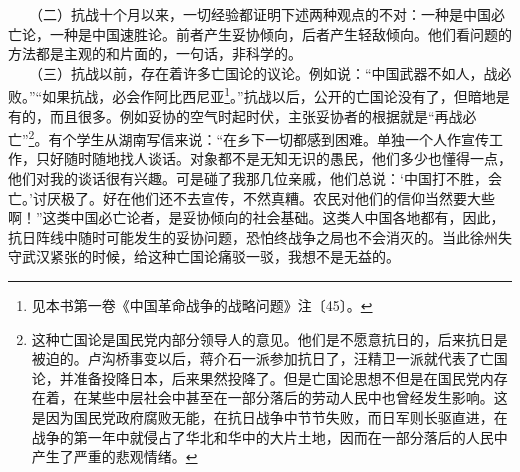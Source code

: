 \documentclass[cn,11pt,chinese]{elegantbook}
\begin{document}
　　（二）抗战十个月以来，一切经验都证明下述两种观点的不对：一种是中国必亡论，一种是中国速胜论。前者产生妥协倾向，后者产生轻敌倾向。他们看问题的方法都是主观的和片面的，一句话，非科学的。\\
　　（三）抗战以前，存在着许多亡国论的议论。例如说：“中国武器不如人，战必败。”“如果抗战，必会作阿比西尼亚\footnote[2]{ 见本书第一卷《中国革命战争的战略问题》注〔45〕。}。”抗战以后，公开的亡国论没有了，但暗地是有的，而且很多。例如妥协的空气时起时伏，主张妥协者的根据就是“再战必亡”\footnote[3]{ 这种亡国论是国民党内部分领导人的意见。他们是不愿意抗日的，后来抗日是被迫的。卢沟桥事变以后，蒋介石一派参加抗日了，汪精卫一派就代表了亡国论，并准备投降日本，后来果然投降了。但是亡国论思想不但是在国民党内存在着，在某些中层社会中甚至在一部分落后的劳动人民中也曾经发生影响。这是因为国民党政府腐败无能，在抗日战争中节节失败，而日军则长驱直进，在战争的第一年中就侵占了华北和华中的大片土地，因而在一部分落后的人民中产生了严重的悲观情绪。}。有个学生从湖南写信来说：“在乡下一切都感到困难。单独一个人作宣传工作，只好随时随地找人谈话。对象都不是无知无识的愚民，他们多少也懂得一点，他们对我的谈话很有兴趣。可是碰了我那几位亲戚，他们总说：‘中国打不胜，会亡。’讨厌极了。好在他们还不去宣传，不然真糟。农民对他们的信仰当然要大些啊！”这类中国必亡论者，是妥协倾向的社会基础。这类人中国各地都有，因此，抗日阵线中随时可能发生的妥协问题，恐怕终战争之局也不会消灭的。当此徐州失守武汉紧张的时候，给这种亡国论痛驳一驳，我想不是无益的。\\
\end{document}
